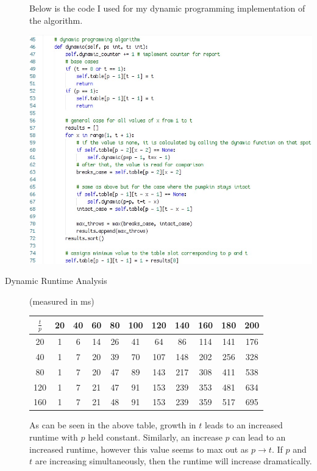 \documentclass[12pt]{article}
\begin{document}
\begin{description}
    Below is the code I used for my dynamic programming implementation of the algorithm.
    \begin{center}
        \includegraphics[width=5.5in]{dynamic.png}
    \end{center}

    \item [Dynamic Runtime Analysis] (measured in ms)
    
    \begin{center}
        \begin{tabular}{|c|c|c|c|c|c|c|c|c|c|c|}\hline
            $\frac{t}{p}$ & 20 & 40 & 60 & 80 & 100 & 120 & 140 & 160 & 180 & 200 \\\hline
            20 & 1 & 6 & 14 & 26 & 41 & 64 & 86 & 114 & 141 & 176 \\\hline
            40 & 1 & 7 & 20 & 39 & 70 & 107 & 148 & 202 & 256 & 328 \\\hline
            80 & 1 & 7 & 20 & 47 & 89 & 143 & 217 & 308 & 411 & 538 \\\hline
            120 & 1 & 7 & 21 & 47 & 91 & 153 & 239 & 353 & 481 & 634 \\\hline
            160 & 1 & 7 & 21 & 48 & 91 & 153 & 239 & 359 & 517 & 695 \\\hline
        \end{tabular}
    \end{center}
    As can be seen in the above table, growth in $t$ leads to an increased runtime
    with $p$ held constant. Similarly, an increase $p$ can lead to an increased
    runtime, however this value seems to max out as $p \to t$. If $p$ and $t$ are
    increasing simultaneously, then the runtime will increase dramatically.
\end{description}
\end{document}
